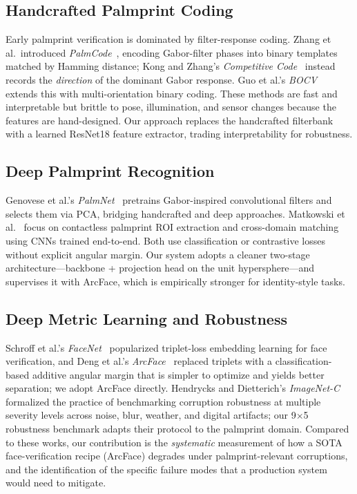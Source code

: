 \documentclass[conference]{IEEEtran}
\begin{document}
\subsection{Handcrafted Palmprint Coding}
Early palmprint verification is dominated by filter-response coding. Zhang et al.\ introduced \textit{PalmCode}~\cite{zhang2003palmcode}, encoding Gabor-filter phases into binary templates matched by Hamming distance; Kong and Zhang's \textit{Competitive Code}~\cite{kong2004competitive} instead records the \emph{direction} of the dominant Gabor response. Guo et al.'s \textit{BOCV}~\cite{guo2009bocv} extends this with multi-orientation binary coding. These methods are fast and interpretable but brittle to pose, illumination, and sensor changes because the features are hand-designed. Our approach replaces the handcrafted filterbank with a learned ResNet18 feature extractor, trading interpretability for robustness.

\subsection{Deep Palmprint Recognition}
Genovese et al.'s \textit{PalmNet}~\cite{genovese2019palmnet} pretrains Gabor-inspired convolutional filters and selects them via PCA, bridging handcrafted and deep approaches. Matkowski et al.~\cite{matkowski2020palmprint} focus on contactless palmprint ROI extraction and cross-domain matching using CNNs trained end-to-end. Both use classification or contrastive losses without explicit angular margin. Our system adopts a cleaner two-stage architecture---backbone + projection head on the unit hypersphere---and supervises it with ArcFace, which is empirically stronger for identity-style tasks.

\subsection{Deep Metric Learning and Robustness}
Schroff et al.'s \textit{FaceNet}~\cite{schroff2015facenet} popularized triplet-loss embedding learning for face verification, and Deng et al.'s \textit{ArcFace}~\cite{deng2019arcface} replaced triplets with a classification-based additive angular margin that is simpler to optimize and yields better separation; we adopt ArcFace directly. Hendrycks and Dietterich's \textit{ImageNet-C}~\cite{hendrycks2019benchmarking} formalized the practice of benchmarking corruption robustness at multiple severity levels across noise, blur, weather, and digital artifacts; our 9$\times$5 robustness benchmark adapts their protocol to the palmprint domain. Compared to these works, our contribution is the \emph{systematic} measurement of how a SOTA face-verification recipe (ArcFace) degrades under palmprint-relevant corruptions, and the identification of the specific failure modes that a production system would need to mitigate.
\end{document}
